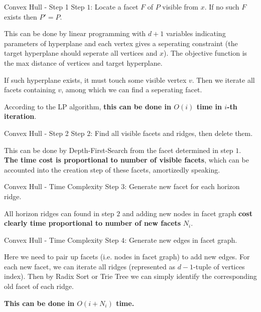\documentclass{beamer}
\begin{document}
\begin{frame}{Convex Hull - Step 1}
	Step $1$: Locate a facet $F$ of $P$ visible from $x$. If no such $F$ exists then $P' = P$.

	\vspace{\baselineskip}

	This can be done by linear programming with $d + 1$ variables indicating parameters of hyperplane and
	each vertex gives a seperating constraint (the target hyperplane should seperate all vertices and $x$).
	The objective function is the max distance of vertices and target hyperplane.

	\vspace{\baselineskip}

	If such hyperplane exists, it must touch some visible vertex $v$.
	Then we iterate all facets containing $v$, among which we can find a seperating facet.

	\vspace{\baselineskip}

	According to the LP algorithm, \textbf{this can be done in $O(i)$ time in $i$-th iteration}.
\end{frame}
\begin{frame}{Convex Hull - Step 2}
	Step $2$: Find all visible facets and ridges, then delete them.

	\vspace{\baselineskip}

	This can be done by Depth-First-Search from the facet determined in step $1$.
	\textbf{The time cost is proportional to number of visible facets}, which can be accounted
	into the creation step of these facets, amortizedly speaking.
\end{frame}
\begin{frame}{Convex Hull - Time Complexity}
	Step $3$: Generate new facet for each horizon ridge.

	\vspace{\baselineskip}

	All horizon ridges can found in step $2$ and adding new nodes in facet graph
	\textbf{cost clearly time proportional to number of new facets} $N_i$.
\end{frame}
\begin{frame}{Convex Hull - Time Complexity}
	Step $4$: Generate new edges in facet graph.

	\vspace{\baselineskip}

	Here we need to pair up facets (i.e. nodes in facet graph) to add new edges.
	For each new facet, we can iterate all ridges (represented as $d-1$-tuple of vertices index).
	Then by Radix Sort or Trie Tree we can simply identify the corresponding old facet of each ridge.

	\vspace{\baselineskip}

	\textbf{This can be done in $O(i + N_i)$ time.}
\end{frame}
\end{document}
